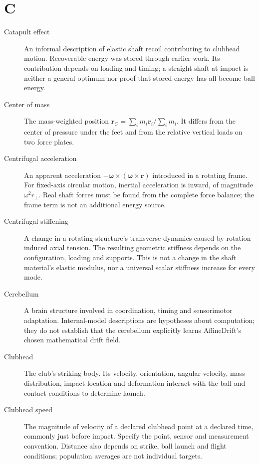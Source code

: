 \section*{C}
\begin{description}

\item[Catapult effect] An informal description of elastic shaft recoil contributing to clubhead motion. Recoverable energy was stored through earlier work. Its contribution depends on loading and timing; a straight shaft at impact is neither a general optimum nor proof that stored energy has all become ball energy.

\item[Center of mass] The mass-weighted position $\mathbf{r}_C=\sum_i m_i\mathbf{r}_i/\sum_i m_i$. It differs from the center of pressure under the feet and from the relative vertical loads on two force plates.

\item[Centrifugal acceleration] An apparent acceleration $-\boldsymbol{\omega}\times(\boldsymbol{\omega}\times\mathbf{r})$ introduced in a rotating frame. For fixed-axis circular motion, inertial acceleration is inward, of magnitude $\omega^2r_\perp$. Real shaft forces must be found from the complete force balance; the frame term is not an additional energy source.

\item[Centrifugal stiffening] A change in a rotating structure's transverse dynamics caused by rotation-induced axial tension. The resulting geometric stiffness depends on the configuration, loading and supports. This is not a change in the shaft material's elastic modulus, nor a universal scalar stiffness increase for every mode.

\item[Cerebellum] A brain structure involved in coordination, timing and sensorimotor adaptation. Internal-model descriptions are hypotheses about computation; they do not establish that the cerebellum explicitly learns AffineDrift's chosen mathematical drift field.

\item[Clubhead] The club's striking body. Its velocity, orientation, angular velocity, mass distribution, impact location and deformation interact with the ball and contact conditions to determine launch.

\item[Clubhead speed] The magnitude of velocity of a declared clubhead point at a declared time, commonly just before impact. Specify the point, sensor and measurement convention. Distance also depends on strike, ball launch and flight conditions; population averages are not individual targets.


\end{description}
